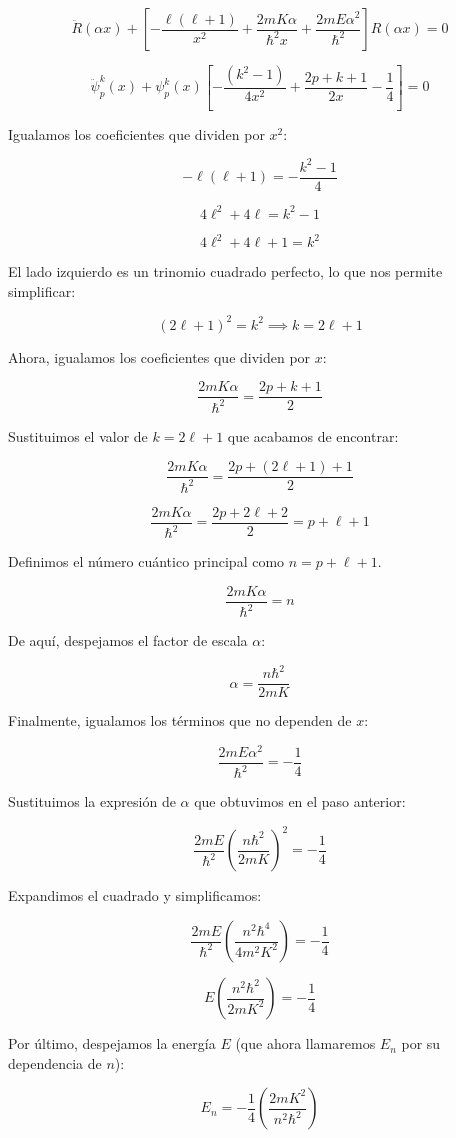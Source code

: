 \documentclass[a4paper]{article}
\begin{document}
$$\ddot{R}(\alpha x) + \left[ -\frac{\ell(\ell+1)}{x^2} + \frac{2mK\alpha}{\hbar^2 x} + \frac{2mE\alpha^2}{\hbar^2} \right] R(\alpha x) = 0$$

$$\ddot{\psi}_p^k(x) + \psi_p^k(x) \left[ -\frac{(k^2 - 1)}{4x^2} + \frac{2p + k + 1}{2x} - \frac{1}{4} \right] = 0$$

Igualamos los coeficientes que dividen por $x^2$:

$$-\ell(\ell+1) = -\frac{k^2 - 1}{4}$$

$$4\ell^2 + 4\ell = k^2 - 1$$

$$4\ell^2 + 4\ell + 1 = k^2$$

El lado izquierdo es un trinomio cuadrado perfecto, lo que nos permite simplificar:

$$(2\ell + 1)^2 = k^2 \implies k = 2\ell + 1$$

Ahora, igualamos los coeficientes que dividen por $x$:

$$\frac{2mK\alpha}{\hbar^2} = \frac{2p + k + 1}{2}$$

Sustituimos el valor de $k = 2\ell + 1$ que acabamos de encontrar:

$$\frac{2mK\alpha}{\hbar^2} = \frac{2p + (2\ell + 1) + 1}{2}$$

$$\frac{2mK\alpha}{\hbar^2} = \frac{2p + 2\ell + 2}{2} = p + \ell + 1$$

Definimos el número cuántico principal como $n = p + \ell + 1$.

$$\frac{2mK\alpha}{\hbar^2} = n$$

De aquí, despejamos el factor de escala $\alpha$:

$$\alpha = \frac{n\hbar^2}{2mK}$$

Finalmente, igualamos los términos que no dependen de $x$:

$$\frac{2mE\alpha^2}{\hbar^2} = -\frac{1}{4}$$

Sustituimos la expresión de $\alpha$ que obtuvimos en el paso anterior:

$$\frac{2mE}{\hbar^2} \left( \frac{n\hbar^2}{2mK} \right)^2 = -\frac{1}{4}$$

Expandimos el cuadrado y simplificamos:

$$\frac{2mE}{\hbar^2} \left( \frac{n^2\hbar^4}{4m^2K^2} \right) = -\frac{1}{4}$$

$$E \left( \frac{n^2\hbar^2}{2mK^2} \right) = -\frac{1}{4}$$

Por último, despejamos la energía $E$ (que ahora llamaremos $E_n$ por su dependencia de $n$):

$$E_n = -\frac{1}{4} \left( \frac{2mK^2}{n^2\hbar^2} \right)$$
\end{document}
